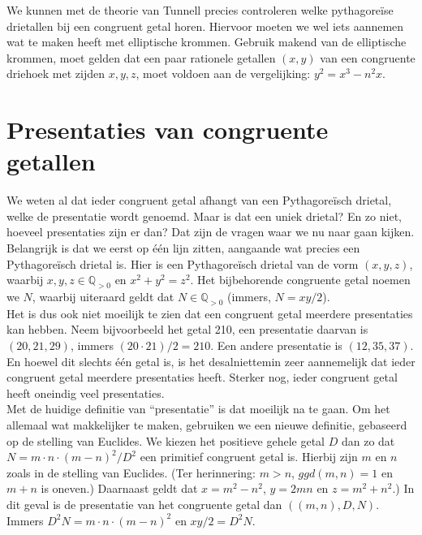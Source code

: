 \documentclass[12pt,reqno]{article}
\newcommand*{\QQ}{\ensuremath{\mathbb{Q}}}
\theoremstyle{theorem}
\theoremstyle{definition}
\begin{document}
	We kunnen met de theorie van Tunnell precies controleren welke pythagore\"ise drietallen bij een congruent getal horen. Hiervoor moeten we wel iets aannemen wat te maken heeft met elliptische krommen. Gebruik makend van de elliptische krommen, moet gelden dat een paar rationele getallen $(x,y)$ van een congruente driehoek met zijden $x,y,z$, moet voldoen aan de vergelijking: $y^2=x^3-n^2x$.
	
	
	\section{Presentaties van congruente getallen}
	We weten al dat ieder congruent getal afhangt van een Pythagore\"isch drietal, welke de presentatie wordt genoemd. Maar is dat een uniek drietal? En zo niet, hoeveel presentaties zijn er dan? Dat zijn de vragen waar we nu naar gaan kijken.\\
	
	Belangrijk is dat we eerst op \'e\'en lijn zitten, aangaande wat precies een Pythagore\"isch drietal is. Hier is een Pythagore\"isch drietal van de vorm $(x,y,z)$, waarbij $x,y,z\in \QQ_{>0}$ en $x^2 + y^2 = z^2$. Het bijbehorende congruente getal noemen we $N$, waarbij uiteraard geldt dat $N\in \QQ_{>0}$ (immers, $N = xy / 2$).\\
	
	Het is dus ook niet moeilijk te zien dat een congruent getal meerdere presentaties kan hebben. Neem bijvoorbeeld het getal 210, een presentatie daarvan is $(20,21,29)$, immers $(20\cdot 21)/2 = 210$. Een andere presentatie is $(12,35,37)$. En hoewel dit slechts \'e\'en getal is, is het desalniettemin zeer aannemelijk dat ieder congruent getal meerdere presentaties heeft. Sterker nog, ieder congruent getal heeft oneindig veel presentaties.\\
	
	Met de huidige definitie van ``presentatie'' is dat moeilijk na te gaan. Om het allemaal wat makkelijker te maken, gebruiken we een nieuwe definitie, gebaseerd op {\color{red}de stelling van Euclides}. We kiezen het positieve gehele getal $D$ dan zo dat $N=m\cdot n \cdot (m-n)^2/D^2$ een primitief congruent getal is. Hierbij zijn $m$ en $n$ zoals in de stelling van Euclides. (Ter herinnering: $m>n$, $ggd(m,n) = 1$ en $m+n$ is oneven.) Daarnaast geldt dat $x = m^2 - n^2$, $y = 2mn$ en $z = m^2 + n^2$.) In dit geval is de presentatie van het congruente getal dan $((m,n),D,N)$. Immers $D^2N = m\cdot n \cdot (m-n)^2$ en $xy/2 = D^2N$.\\
	
\end{document}
